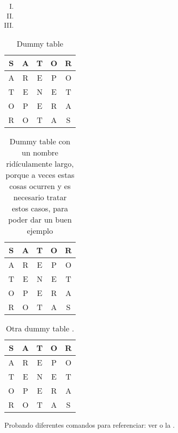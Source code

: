 \lipsum[19-22]
\begin{enumerate}[(I)]
\item \lipsum[4][1]
\item \lipsum[4][2]
\item \lipsum[4][3]
\end{enumerate}

\begin{table}[htbp]
	\centering
	\begin{tabular}{|c|c|c|c|c|} \hline
        S & A & T & O & R\\ \hline
        A & R & E & P & O\\ \hline
        T & E & N & E & T\\ \hline
        O & P & E & R & A\\ \hline
        R & O & T & A & S\\ \hline
    \end{tabular}
    
    \caption{Dummy table}
    \label{tab:dummytable1}
\end{table}

\lipsum[23-26]

\begin{table}[hbtp]
	\centering
	\begin{tabular}{|c|c|c|c|c|} \hline
        S & A & T & O & R\\ \hline
        A & R & E & P & O\\ \hline
        T & E & N & E & T\\ \hline
        O & P & E & R & A\\ \hline
        R & O & T & A & S\\ \hline
    \end{tabular}
    
    \caption[Dummy table de nombre largo]{Dummy table con un nombre ridículamente largo, porque a veces estas cosas ocurren y es necesario tratar estos casos, para poder dar un buen ejemplo}
    \label{tab:dummytable2}
\end{table}

\begin{table}[htbp]
	\centering
	\begin{tabular}{|c|c|c|c|c|} \hline
        S & A & T & O & R\\ \hline
        A & R & E & P & O\\ \hline
        T & E & N & E & T\\ \hline
        O & P & E & R & A\\ \hline
        R & O & T & A & S\\ \hline
    \end{tabular}
    
    \caption{Otra dummy table \parencite{cabrera2015evolucion}.}
    \label{tab:dummytable3}
\end{table}

\lipsum[27-30]

Probando diferentes comandos para referenciar: ver  o la  .